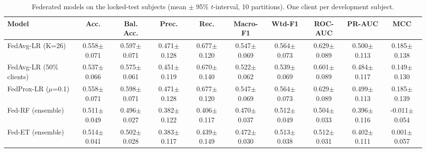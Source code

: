 \begin{table}[!t]\centering\caption{Federated models on the locked-test subjects (mean $\pm$ 95\% $t$-interval, 10 partitions). One client per development subject.}\label{tab:fed}\scriptsize\setlength{\tabcolsep}{3pt}\begin{tabular}{lccccccccc}\toprule
Model & Acc. & Bal. Acc. & Prec. & Rec. & Macro-F1 & Wtd-F1 & ROC-AUC & PR-AUC & MCC\\\midrule
FedAvg-LR (K=26) & 0.558$\pm$0.071 & 0.597$\pm$0.071 & 0.471$\pm$0.128 & 0.677$\pm$0.120 & 0.547$\pm$0.069 & 0.564$\pm$0.073 & 0.629$\pm$0.089 & 0.500$\pm$0.113 & 0.185$\pm$0.138\\
FedAvg-LR (50\% clients) & 0.537$\pm$0.066 & 0.575$\pm$0.061 & 0.451$\pm$0.119 & 0.670$\pm$0.140 & 0.522$\pm$0.062 & 0.539$\pm$0.069 & 0.601$\pm$0.089 & 0.484$\pm$0.117 & 0.149$\pm$0.130\\
FedProx-LR ($\mu$=0.1) & 0.558$\pm$0.071 & 0.598$\pm$0.071 & 0.471$\pm$0.128 & 0.677$\pm$0.120 & 0.547$\pm$0.069 & 0.564$\pm$0.073 & 0.629$\pm$0.089 & 0.499$\pm$0.113 & 0.185$\pm$0.139\\
Fed-RF (ensemble) & 0.511$\pm$0.049 & 0.496$\pm$0.027 & 0.382$\pm$0.122 & 0.406$\pm$0.117 & 0.470$\pm$0.037 & 0.512$\pm$0.049 & 0.504$\pm$0.033 & 0.396$\pm$0.116 & -0.011$\pm$0.054\\
Fed-ET (ensemble) & 0.514$\pm$0.041 & 0.502$\pm$0.028 & 0.383$\pm$0.117 & 0.439$\pm$0.149 & 0.472$\pm$0.030 & 0.513$\pm$0.038 & 0.512$\pm$0.031 & 0.402$\pm$0.111 & 0.001$\pm$0.057\\
\bottomrule\end{tabular}\end{table}
